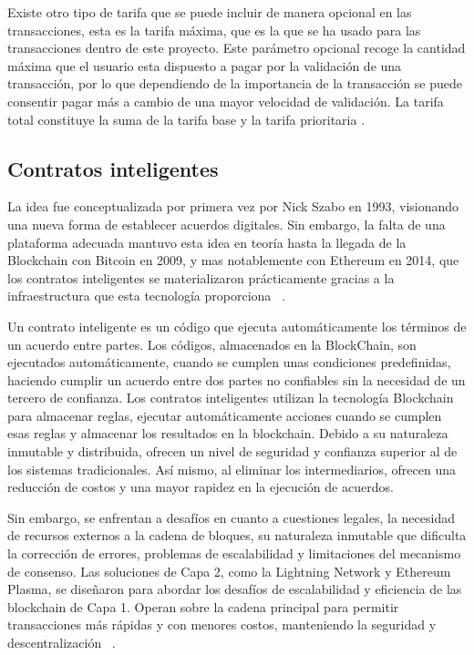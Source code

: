 Existe otro tipo de tarifa que se puede incluir de manera opcional en las transacciones, esta es la tarifa máxima, que es la que se ha usado para las transacciones dentro de este proyecto.
Este parámetro opcional recoge la cantidad máxima que el usuario esta dispuesto a pagar por la validación de una transacción, por lo que dependiendo de la importancia de la transacción se puede consentir pagar más a cambio de una mayor velocidad de validación.
La tarifa total constituye la suma de la tarifa base y la tarifa prioritaria \cite{gasEthereum}.


\subsection{Contratos inteligentes}

La idea fue conceptualizada por primera vez por Nick Szabo en 1993, visionando una nueva forma de establecer acuerdos digitales. Sin embargo, la falta de una plataforma adecuada mantuvo esta idea en teoría hasta la llegada de la Blockchain con Bitcoin en 2009, y mas notablemente con Ethereum en 2014, que los contratos inteligentes se materializaron prácticamente gracias a la infraestructura que esta tecnología proporciona ~\cite{smartcontractHistoria}.

Un contrato inteligente es un código que ejecuta automáticamente los términos de un acuerdo entre partes. Los códigos, almacenados en la BlockChain, son ejecutados automáticamente, cuando se cumplen unas condiciones predefinidas, haciendo cumplir un acuerdo entre dos partes no confiables sin la necesidad de un tercero de confianza.
Los contratos inteligentes utilizan la tecnología Blockchain para almacenar reglas, ejecutar automáticamente acciones cuando se cumplen esas reglas y almacenar los resultados en la blockchain. Debido a su naturaleza inmutable y distribuida, ofrecen un nivel de seguridad y confianza superior al de los sistemas tradicionales. Así mismo, al eliminar los intermediarios, ofrecen una reducción de costos y una mayor rapidez en la ejecución de acuerdos.

Sin embargo, se enfrentan a desafíos en cuanto a cuestiones legales, la necesidad de recursos externos a la cadena de bloques, su naturaleza inmutable que dificulta la corrección de errores, problemas de escalabilidad y limitaciones del mecanismo de consenso. Las soluciones de Capa 2, como la Lightning Network y Ethereum Plasma, se diseñaron para abordar los desafíos de escalabilidad y eficiencia de las blockchain de Capa 1. Operan sobre la cadena principal para permitir transacciones más rápidas y con menores costos, manteniendo la seguridad y descentralización ~\cite{AplicacionesDesafiosSmartcontract}.



